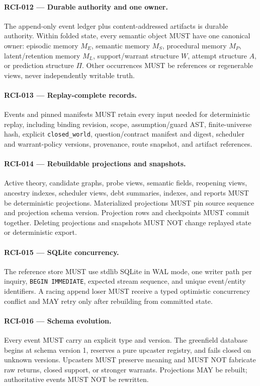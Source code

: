 \documentclass[11pt]{article}
\begin{document}
\paragraph{RCI-012 --- Durable authority and one owner.}
The append-only event ledger plus content-addressed artifacts is durable
authority. Within folded state, every semantic object MUST have one canonical
owner: episodic memory \(M_E\), semantic memory \(M_S\), procedural memory
\(M_P\), latent/retention memory \(M_L\), support/warrant structure \(W\),
attempt structure \(A\), or prediction structure \(\Pi\). Other occurrences
MUST be references or regenerable views, never independently writable truth.

\paragraph{RCI-013 --- Replay-complete records.}
Events and pinned manifests MUST retain every input needed for deterministic
replay, including binding revision, scope, assumption/guard AST, finite-universe
hash, explicit \texttt{closed\_world}, question/contract manifest and digest,
scheduler and warrant-policy versions, provenance, route snapshot, and artifact
references.

\paragraph{RCI-014 --- Rebuildable projections and snapshots.}
Active theory, candidate graphs, probe views, semantic fields, reopening views,
ancestry indexes, scheduler views, debt summaries, indexes, and reports MUST be
deterministic projections. Materialized projections MUST pin source sequence
and projection schema version. Projection rows and checkpoints MUST commit
together. Deleting projections and snapshots MUST NOT change replayed state or
deterministic export.

\paragraph{RCI-015 --- SQLite concurrency.}
The reference store MUST use stdlib SQLite in WAL mode, one writer path per
inquiry, \texttt{BEGIN IMMEDIATE}, expected stream sequence, and unique
event/entity identifiers. A racing append loser MUST receive a typed optimistic
concurrency conflict and MAY retry only after rebuilding from committed state.

\paragraph{RCI-016 --- Schema evolution.}
Every event MUST carry an explicit type and version. The greenfield database
begins at schema version 1, reserves a pure upcaster registry, and fails closed
on unknown versions. Upcasters MUST preserve meaning and MUST NOT fabricate raw
returns, closed support, or stronger warrants. Projections MAY be rebuilt;
authoritative events MUST NOT be rewritten.
\end{document}
